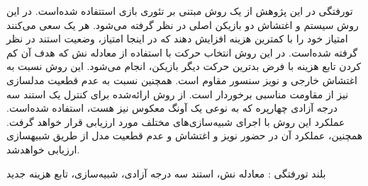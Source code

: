 


\pagestyle{empty}

\begin{وسط‌چین}
\end{وسط‌چین}

‌تورفتگی در این پژوهش از یک روش مبتنی بر تئوری بازی استتفاده شده‌است. در این روش سیستم و اغتشاش دو بازیکن اصلی در نظر گرفته می‌شود. هر یک سعی می‌کنند امتیاز خود را  با کمترین هزینه افزایش دهند که در اینجا امتیاز، وضعیت استند در نظر گرفته ‌شده‌است. در این روش انتخاب حرکت با استفاده از معادله نش
 که هدف آن کم کردن تابع هزینه با فرض بدترین حرکت دیگر بازیکن، انجام می‌شود.
این روش نسبت به اغتشاش خارجی و 
نویز سنسور مقاوم است. همچنین نسبت به عدم قطعیت مدلسازی نیز از مقاومت مناسبی برخوردار است. از روش ارائه‌شده برای کنترل یک استند سه درجه آزادی چهارپره که به نوعی یک آونگ معكوس نیز هست، استفاده شده‌است. 
عملكرد این روش با اجرای شبیه‌سازی‌های مختلف مورد ارزیابی قرار خواهد گرفت. همچنین، عملكرد آن 
در حضور نویز و اغتشاش و عدم قطعیت مدل از طریق شبیهسازی ارزیابی خواهد‌شد.

‌بلند
‌تورفتگی : 
معادله نش، استند سه درجه آزادی، شبیه‌سازی، تابع هزینه
‌جدید
